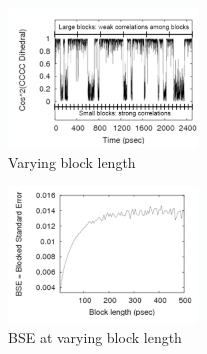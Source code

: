 \begin{multicols}{2}

	\begin{figure}[H]
		\includegraphics[width = 0.45\textwidth]{block-length}
		\caption{Varying block length}
		\label{fig:block-length}
	\end{figure}

	\columnbreak

	\begin{figure}[H]
		\includegraphics[width = 0.45\textwidth]{bse}
		\caption{BSE at varying block length}
		\label{fig:bse}
	\end{figure}

\end{multicols}

